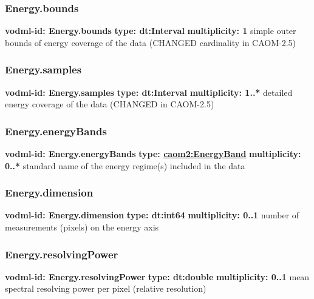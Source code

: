     \subsubsection{Energy.bounds}
      \textbf{vodml-id: Energy.bounds} \newline
      \textbf{type: dt:Interval} \newline
      \textbf{multiplicity: 1} \newline
      simple outer bounds of energy coverage of the data (CHANGED cardinality in CAOM-2.5)

    \subsubsection{Energy.samples}
      \textbf{vodml-id: Energy.samples} \newline
      \textbf{type: dt:Interval} \newline
      \textbf{multiplicity: 1..*} \newline
      detailed energy coverage of the data (CHANGED in CAOM-2.5)

    \subsubsection{Energy.energyBands}
      \textbf{vodml-id: Energy.energyBands} \newline
      \textbf{type: \hyperref[sect:EnergyBand]{caom2:EnergyBand}} \newline
      \textbf{multiplicity: 0..*} \newline
      standard name of the energy regime(s) included in the data

    \subsubsection{Energy.dimension}
      \textbf{vodml-id: Energy.dimension} \newline
      \textbf{type: dt:int64} \newline
      \textbf{multiplicity: 0..1} \newline
      number of measurements (pixels) on the energy axis

    \subsubsection{Energy.resolvingPower}
      \textbf{vodml-id: Energy.resolvingPower} \newline
      \textbf{type: dt:double} \newline
      \textbf{multiplicity: 0..1} \newline
      mean spectral resolving power per pixel (relative resolution)

